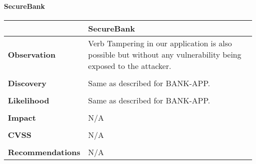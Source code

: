 \paragraph{SecureBank} \mbox{}
\begin{longtable*}{p{.30\textwidth} | p{.70\textwidth}}
    \hline
    & \textbf{SecureBank} \\
    \hline
    \textbf{Observation} &
       Verb Tampering in our application is also possible but without any vulnerability being exposed to the attacker.
    \\\\
    \textbf{Discovery} &
    	Same as described for BANK-APP.
    \\\\ 
    \textbf{Likelihood} &
		Same as described for BANK-APP.
    \\\\
    \textbf{Impact} &
      N/A
    \\\\
    \textbf{CVSS} &
      N/A
     \\\\
     \textbf{Recommendations} &
     N/A
     \\
    \hline
\end{longtable*}
\clearpage